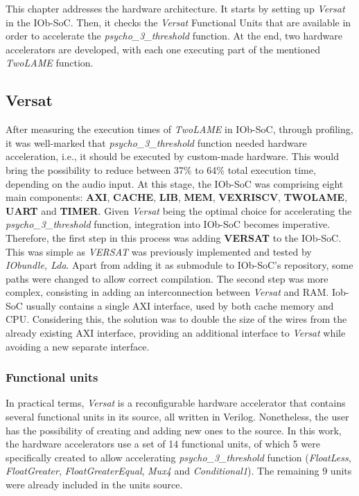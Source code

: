 This chapter addresses the hardware architecture. It starts by setting up \textit{Versat} in the IOb-SoC. Then, it checks the \textit{Versat} Functional Units that are available in order to accelerate the \textit{psycho\_3\_threshold} function. At the end, two hardware accelerators are developed, with each one executing part of the mentioned \textit{TwoLAME} function.

\subsection{Versat}

After measuring the execution times of \textit{TwoLAME} in IOb-SoC, through profiling, it was well-marked that \textit{psycho\_3\_threshold} function needed hardware acceleration, i.e., it should be executed by custom-made hardware. This would bring the possibility to reduce between 37\% to 64\% total execution time, depending on the audio input.
At this stage, the IOb-SoC was comprising eight main components: \textbf{AXI}, \textbf{CACHE}, \textbf{LIB}, \textbf{MEM}, \textbf{VEXRISCV}, \textbf{TWOLAME}, \textbf{UART} and \textbf{TIMER}. Given \textit{Versat} being the optimal choice for accelerating the \textit{psycho\_3\_threshold} function, integration into IOb-SoC becomes imperative.
Therefore, the first step in this process was adding \textbf{VERSAT} to the IOb-SoC. This was simple as \textit{VERSAT} was previously implemented and tested by \textit{IObundle, Lda}. Apart from adding it as submodule to IOb-SoC's repository, some paths were changed to allow correct compilation.
The second step was more complex, consisting in adding an interconnection between \textit{Versat} and RAM. Iob-SoC usually contains a single AXI interface, used by both cache memory and CPU. Considering this, the solution was to double the size of the wires from the already existing AXI interface, providing an additional interface to \textit{Versat} while avoiding a new separate interface.

\subsubsection{Functional units}
In practical terms, \textit{Versat} is a reconfigurable hardware accelerator that contains several functional units in its source, all written in Verilog. Nonetheless, the user has the possibility of creating and adding new ones to the source.
In this work, the hardware accelerators use a set of 14 functional units, of which 5 were specifically created to allow accelerating \textit{psycho\_3\_threshold} function (\textit{FloatLess}, \textit{FloatGreater}, \textit{FloatGreaterEqual}, \textit{Mux4} and \textit{Conditional1}). The remaining 9 units were already included in the units source.

